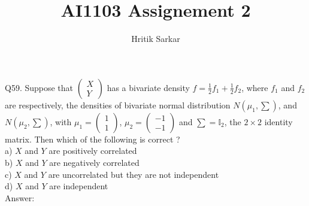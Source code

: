 \documentclass{article}
\title{AI1103 Assignement 2}
\author{Hritik Sarkar}
\theoremstyle{remark}
\begin{document}
\maketitle
Q59. Suppose that $\begin{pmatrix} X\\ Y \end{pmatrix}$ has a bivariate density $f = \frac{1}{2}f_1 + \frac{1}{2}f_2$, where $f_1$ and $f_2$ are respectively, the densities of bivariate normal distribution $N(\mu_{1},\sum)$, and $N(\mu_{2},\sum)$, with $\mu_{1} = \begin{pmatrix} 1 \\ 1 \end{pmatrix}$, $\mu_{2} = \begin{pmatrix} -1 \\ -1 \end{pmatrix}$ and $\sum = \mathbb{I}_{2}$, the $2 \times 2$ identity matrix. Then which of the following is correct ?
\newline
\\a) $X$ and $Y$ are positively correlated
\\b) $X$ and $Y$ are negatively correlated
\\c) $X$ and $Y$ are uncorrelated but they are not independent
\\d) $X$ and $Y$ are independent
\newline
\\ Answer:
\newline
\end{document}
